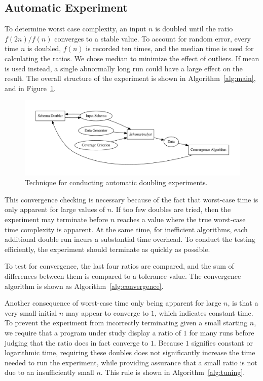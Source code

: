 \documentclass[smallextended]{svjour3}       %
\begin{document}
  \subsection{Automatic Experiment}

To determine worst case complexity, an input $n$ is doubled until the 
ratio $f(2n) / f(n)$ converges to a stable value. To account for random
error, every time $n$ is doubled, $f(n)$ is recorded ten times, and the
median time is used for calculating the ratios.  We chose
median to minimize the effect of outliers. If mean is used instead, a
single abnormally long run could have a large effect on the result. The overall 
structure of the experiment is shown in Algorithm~\ref{alg:main}, and in
Figure~\ref{fig:doublingexp}.

\begin{figure}
\centering
  \centering
  \includegraphics[width=.5\linewidth]{../diagrams/doublingexp.pdf}
  \caption{Technique for conducting automatic doubling experiments.}
  \label{fig:doublingexp}
\end{figure}


This convergence checking is necessary because of the fact that worst-case
time is only apparent for large values of $n$. If too few doubles
are tried, then the experiment may terminate before $n$ reaches a value
where the true worst-case time complexity is apparent. At the same time,
for inefficient  algorithms, each additional double run incurs a substantial
time overhead. To conduct the testing efficiently, the experiment should
terminate as quickly as possible.

To test for convergence, the last four ratios are compared, and the
sum of differences between them is compared to a tolerance value. The
convergence algorithm is shown as Algorithm~\ref{alg:convergence}.
  
Another consequence of worst-case time only being apparent for large
$n$, is that a very small initial $n$ may appear to converge to $1$,
which indicates constant time. To prevent the
experiment from incorrectly terminating given a small starting $n$, we
require that a program under study display a ratio of $1$ for many
runs before judging that the ratio does in fact converge to $1$. Because 
$1$ signifies constant or logarithmic 
time, requiring these doubles does not significantly increase the time needed
to run the experiment, while providing assurance that a small ratio is not due
to an insufficiently small $n$. This rule is shown in 
Algorithm~\ref{alg:tuning}.
\end{document}
